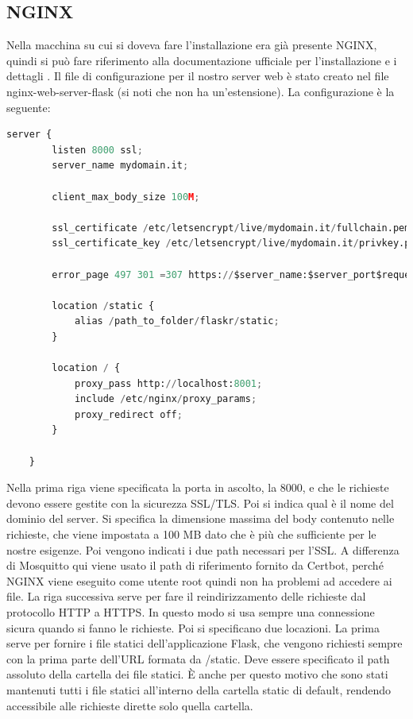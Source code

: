 \subsection{NGINX}
\label{secsub:flask-produzione-nginx}
Nella macchina su cui si doveva fare l'installazione era già presente NGINX, 
quindi si può fare riferimento alla documentazione ufficiale per l'installazione e i dettagli \cite{flask-doc-deploying-nginx}.
Il file di configurazione per il nostro server web è stato creato nel file nginx-web-server-flask 
(si noti che non ha un'estensione).
La configurazione è la seguente:
\begin{lstlisting}[language=python]
	server {
		listen 8000 ssl;
		server_name mydomain.it;
	
		client_max_body_size 100M;
		
		ssl_certificate /etc/letsencrypt/live/mydomain.it/fullchain.pem;
		ssl_certificate_key /etc/letsencrypt/live/mydomain.it/privkey.pem;
		
		error_page 497 301 =307 https://$server_name:$server_port$request_uri;
	
		location /static {
			alias /path_to_folder/flaskr/static;	
		}
	
		location / {
			proxy_pass http://localhost:8001;
			include /etc/nginx/proxy_params;
			proxy_redirect off;
		}
	
	}
\end{lstlisting}
Nella prima riga viene specificata la porta in ascolto, la 8000, 
e che le richieste devono essere gestite con la sicurezza SSL/TLS.
Poi si indica qual è il nome del dominio del server.
Si specifica la dimensione massima del body contenuto nelle richieste,
che viene impostata a 100 MB dato che è più che sufficiente per le nostre esigenze.
Poi vengono indicati i due path necessari per l'SSL. 
A differenza di Mosquitto qui viene usato il path di riferimento fornito da Certbot, perché
NGINX viene eseguito come utente root quindi non ha problemi ad accedere ai file.
La riga successiva serve per fare il reindirizzamento delle richieste dal protocollo HTTP a HTTPS.
In questo modo si usa sempre una connessione sicura quando si fanno le richieste.
Poi si specificano due locazioni.
La prima serve per fornire i file statici dell'applicazione Flask, 
che vengono richiesti sempre con la prima parte dell'URL formata da /static.
Deve essere specificato il path assoluto della cartella dei file statici.
È anche per questo motivo che sono stati mantenuti tutti i file statici all'interno della cartella static di default,
rendendo accessibile alle richieste dirette solo quella cartella.
